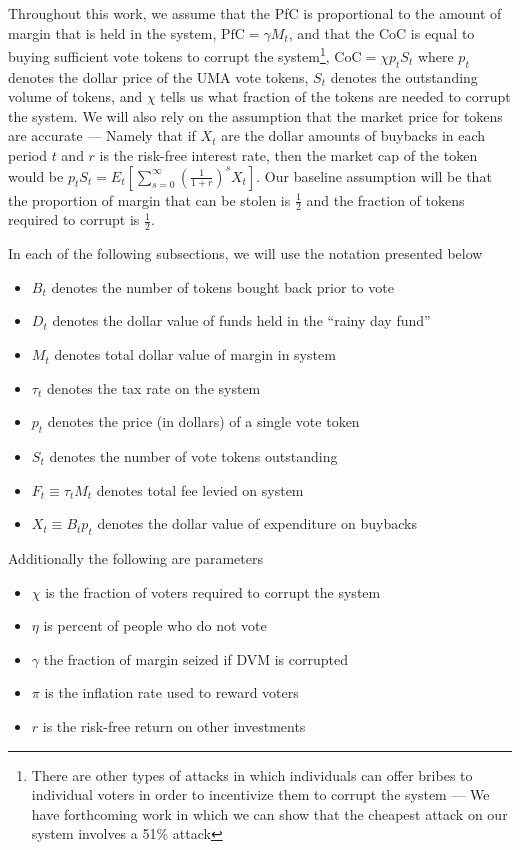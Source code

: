 \documentclass[12pt]{article}
\begin{document}
  Throughout this work, we assume that the PfC is proportional to the amount of margin that is held
  in the system, $\text{PfC} = \gamma M_t$, and that the CoC is equal to buying sufficient vote
  tokens to corrupt the system\footnote{There are other types of attacks in which individuals can
  offer bribes to individual voters in order to incentivize them to corrupt the system --- We have
  forthcoming work in which we can show that the cheapest attack on our system involves a 51\%
  attack}, $\text{CoC} = \chi p_t S_t$ where $p_t$ denotes the dollar price of the UMA vote tokens,
  $S_t$ denotes the outstanding volume of tokens, and $\chi$ tells us what fraction of the tokens
  are needed to corrupt the system. We will also rely on the assumption that the market price for
  tokens are accurate --- Namely that if $X_t$ are the dollar amounts of buybacks in each period
  $t$ and $r$ is the risk-free interest rate, then the market cap of the token would be
  $p_t S_t = E_t \left[ \sum_{s=0}^{\infty} \left(\frac{1}{1 + r}\right)^s X_t \right]$.
  Our baseline assumption will be that the proportion of margin that can be stolen is $\frac{1}{2}$
  and the fraction of tokens required to corrupt is $\frac{1}{2}$.

  In each of the following subsections, we will use the notation presented below

  \begin{itemize}
    \item $B_t$ denotes the number of tokens bought back prior to vote
    \item $D_t$ denotes the dollar value of funds held in the ``rainy day fund''
    \item $M_t$ denotes total dollar value of margin in system
    \item $\tau_t$ denotes the tax rate on the system
    \item $p_t$ denotes the price (in dollars) of a single vote token
    \item $S_t$ denotes the number of vote tokens outstanding
    \item $F_t \equiv \tau_t M_t$ denotes total fee levied on system
    \item $X_t \equiv B_t p_t$ denotes the dollar value of expenditure on buybacks
  \end{itemize}

  Additionally the following are parameters

  \begin{itemize}
    \item $\chi$ is the fraction of voters required to corrupt the system
    \item $\eta$ is percent of people who do not vote
    \item $\gamma$ the fraction of margin seized if DVM is corrupted
    \item $\pi$ is the inflation rate used to reward voters
    \item $r$ is the risk-free return on other investments
  \end{itemize}
\end{document}
